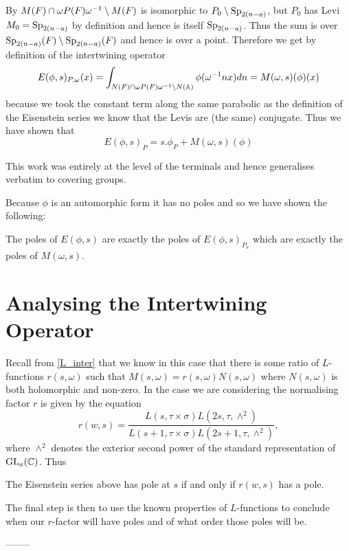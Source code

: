      By \cite[2C]{jiangPolesCertainResidual2013} \(M(F)\cap \omega P(F)\omega^{-1} \setminus M(F)\) is isomorphic to \(P_0 \setminus \operatorname{Sp}_{2(n-a)}\), but \(P_0\) has Levi \(M_0 = \operatorname{Sp}_{2(n-a)}\) by definition and hence is itself \(\operatorname{Sp}_{2(n-a)}\). Thus the sum is over \(\operatorname{Sp}_{2(n-a)}(F) \setminus \operatorname{Sp}_{2(n-a)}(F)\) and hence is over a point. Therefore we get by definition of the intertwining operator
     \[E(\phi, s)_{P, \omega}(x) = \int_{N(F)\cap \omega P(F)\omega\inv \setminus N(\A)} \phi( \omega\inv n x)  dn = M(\omega, s)(\phi)(x)\]
     because we took the constant term along the same parabolic as the definition of the Eisenstein series we know that the Levis are (the same) conjugate.
    Thus we have shown that 
    \[E(\phi, s)_P = s.\phi_P + M(\omega, s )(\phi)\]
    \begin{remark}
        This work was entirely at the level of the terminals and hence generalises verbatim to covering groups.
    \end{remark}
    
    Because \(\phi\) is an automorphic form it has no poles and so we have shown the following:
    \begin{Lemma}
        The poles of \(E(\phi, s)\) are exactly the poles of \(E(\phi,s)_{P_a}\) which are exactly the poles of \(M(\omega, s)\).
    \end{Lemma}
    

    \section{Analysing the Intertwining Operator}
    Recall from \ref{L_inter} that we know in this case that there is some ratio of \(L\)-functions \(r(s, \omega)\) such that \(M(s,\omega) = r(s, \omega)N(s, \omega)\) where \(N(s, \omega)\) is both holomorphic and non-zero. 
     In the case we are considering the normalising factor \(r\) is given by the equation \cite[4A]{jiangPolesCertainResidual2013}
     \[r(w, s) = \frac{L(s, \tau\times \sigma)L(2s, \tau,\wedge^2)}{L(s+1, \tau\times \sigma)L(2s+1, \tau, \wedge^2)},\]
    where \(\wedge^2\) denotes the exterior second power of the standard representation of \(\GL_a(\C)\). Thus

     \begin{Lemma}
        The Eisenstein series above has pole at \(s\) if and only if \(r(w,s)\) has a pole.
     \end{Lemma}
     The final step is then to use the known properties of \(L\)-functions to conclude when our \(r\)-factor will have poles and of what order those poles will be.

    --------

    \begin{Theorem}
        
    \end{Theorem}

    

     
